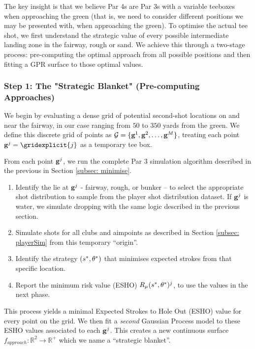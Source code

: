 \documentclass[11pt, letterpaper]{article}
\begin{document}
The key insight is that we believe Par 4s are Par 3s with a variable teeboxes when approaching the green (that is, we need to consider different positions we may be presented with, when approaching the green). To optimise the actual tee shot, we first understand the strategic value of every possible intermediate landing zone in the fairway, rough or sand. We achieve this through a two-stage process: pre-computing the optimal approach from all possible positions and then fitting a GPR surface to those optimal values.

\subsubsection{Step 1: The "Strategic Blanket" (Pre-computing Approaches)}
\label{subsec: strategicBlanket}
We begin by evaluating a dense grid of potential second-shot locations on and near the fairway, in our case ranging from $50$ to $350$ yards from the green. We define this discrete grid of points as $\mathcal{G} = \{\mathbf{g} ^1, \mathbf{g}^2, \ldots, \mathbf{g}^M\}$, treating each point $\grid^j = \gridexplicit{j}$ as a temporary tee box.

From each point $\mathbf{g}^j$, we run the complete Par 3 simulation algorithm described in the previous in Section \ref{subsec: minimise}.

\begin{enumerate}
    \item Identify the lie at $\mathbf{g}^j$ - fairway, rough, or bunker –  to select the appropriate shot distribution to sample from the player shot distribution dataset. If $\mathbf{g}^j$ is water, we simulate dropping with the same logic described in the previous section.
    \item Simulate shots for all clubs and aimpoints as described in Section \ref{subsec: playerSim} from this temporary ``origin''.
    \item Identify the strategy $(s^*, \theta^*)$ that minimises expected strokes from that specific location.
    \item Report the minimum risk value (ESHO) $R_{\mu}(s^*, \theta^*)^j$, to use the values in the next phase.
\end{enumerate}
This process yields a minimal Expected Strokes to Hole Out (ESHO) value for every point on the grid. We then fit a \textit{second} Gaussian Process model to these ESHO values associated to each $\mathbf{g}^j$. This creates a new continuous surface $f_{approach}: \mathbb{R}^2\to \mathbb{R}^+$ which we name a ``strategic blanket''. 
\end{document}
